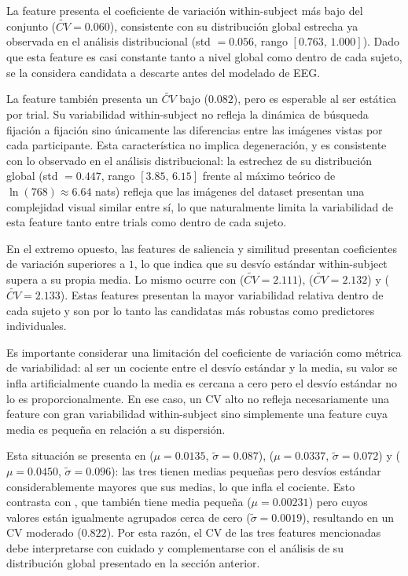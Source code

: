 La feature  presenta el coeficiente de variación within-subject más bajo del conjunto ($\widetilde{CV} = 0.060$), consistente
con su distribución global estrecha ya observada en el análisis distribucional
(std $= 0.056$, rango $[0.763,\, 1.000]$). Dado que esta feature es casi
constante tanto a nivel global como dentro de cada sujeto, se la considera
candidata a descarte antes del modelado de EEG. %

La feature  también presenta un
$\widetilde{CV}$ bajo ($0.082$), pero es esperable al ser
estática por trial. Su variabilidad within-subject no refleja la dinámica 
de búsqueda fijación a fijación sino únicamente las diferencias entre las 
imágenes vistas por cada participante. Esta característica no implica 
degeneración, y es consistente con lo observado en el análisis distribucional: 
la estrechez de su distribución global (std $= 0.447$, rango $[3.85,\, 6.15]$ 
frente al máximo teórico de $\ln(768) \approx 6.64$ nats) refleja que las 
imágenes del dataset presentan una complejidad visual similar entre sí, 
lo que naturalmente limita la variabilidad de esta feature tanto entre 
trials como dentro de cada sujeto.

En el extremo opuesto, las features de saliencia y similitud presentan 
coeficientes de variación superiores a $1$, lo que indica que su desvío 
estándar within-subject supera a su propia media. Lo mismo ocurre con 
 ($\widetilde{CV} = 2.111$), 
 ($\widetilde{CV} = 2.132$) y 
 ($\widetilde{CV} = 2.133$). Estas features 
presentan la mayor variabilidad relativa dentro de cada sujeto y son 
por lo tanto las candidatas más robustas como predictores individuales.

Es importante considerar una limitación del coeficiente de variación como 
métrica de variabilidad: al ser un cociente entre el desvío estándar y la 
media, su valor se infla artificialmente cuando la media es cercana a cero 
pero el desvío estándar no lo es proporcionalmente. En ese caso, un CV 
alto no refleja necesariamente una feature con gran variabilidad 
within-subject sino simplemente una feature cuya media es pequeña en 
relación a su dispersión.

Esta situación se presenta en  ($\mu = 0.0135$, 
$\widetilde{\sigma} = 0.087$),  ($\mu = 0.0337$, 
$\widetilde{\sigma} = 0.072$) y  ($\mu = 0.0450$, 
$\widetilde{\sigma} = 0.096$): las tres tienen medias pequeñas pero 
desvíos estándar considerablemente mayores que sus medias, lo que infla 
el cociente. Esto contrasta con , 
que también tiene media pequeña ($\mu = 0.00231$) pero cuyos valores 
están igualmente agrupados cerca de cero ($\widetilde{\sigma} = 0.0019$), 
resultando en un CV moderado ($0.822$). Por esta razón, el CV de las 
tres features mencionadas debe interpretarse con cuidado y complementarse 
con el análisis de su distribución global presentado en la sección 
anterior.